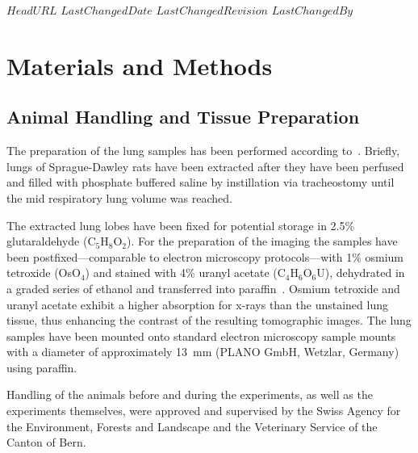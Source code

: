 \svnidlong
{$HeadURL$}
{$LastChangedDate$}
{$LastChangedRevision$}
{$LastChangedBy$}

\begin{center}
\end{center}

\section{Materials and Methods}
\label{sec:materials and methods}
\subsection{Animal Handling and Tissue Preparation}
The preparation of the lung samples has been performed according to~\citet{Schittny1997,Schittny1998}. Briefly, lungs of Sprague-Dawley rats have been extracted after they have been perfused and filled with phosphate buffered saline by instillation via tracheostomy until the mid respiratory lung volume was reached.

The extracted lung lobes have been fixed for potential storage in 2.5\% glutaraldehyde (C$_5$H$_8$O$_2$). For the preparation of the imaging the samples have been postfixed---comparable to electron microscopy protocols---with 1\% osmium tetroxide (OsO$_4$) and stained with 4\% uranyl acetate (C$_4$H$_6$O$_6$U), dehydrated in a graded series of ethanol and transferred into paraffin~\cite{Schittny1997}\cite{Schittny1998}. Osmium tetroxide and uranyl acetate exhibit a higher absorption for x-rays than the unstained lung tissue, thus enhancing the contrast of the resulting tomographic images. The lung samples have been mounted onto standard electron microscopy sample mounts with a diameter of approximately \SI{13}{\milli\meter} (PLANO GmbH, Wetzlar, Germany) using paraffin.

Handling of the animals before and during the experiments, as well as the experiments themselves, were approved and supervised by the Swiss Agency for the Environment, Forests and Landscape and the Veterinary Service of the Canton of Bern.

